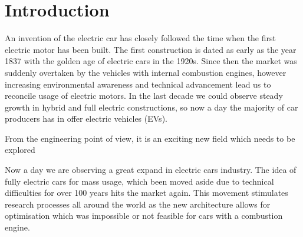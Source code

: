 





\chapter{Introduction}

An invention of the electric car has closely followed the time when the first electric motor has been built. The first construction is dated as early as the year 1837 with the golden age of electric cars in the 1920s. Since then the market was suddenly overtaken by the vehicles with internal combustion engines, however increasing environmental awareness and technical advancement lead us to reconcile usage of electric motors. 
In the last decade we could observe steady growth in hybrid and full electric constructions, so now a day the majority of car producers has in offer electric vehicles (EVs).


From the engineering point of view, it is an exciting new field which needs to be explored 


Now a day we are observing a great expand in electric cars industry. The idea of fully electric cars for mass usage, which been moved aside due to technical difficulties for over 100 years hits the market again. This movement stimulates research processes all around the world as the new architecture allows for optimisation which was impossible or not feasible for cars with a combustion engine.


